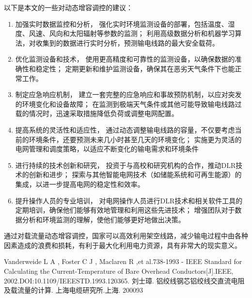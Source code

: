 \documentclass[withoutpreface,bwprint]{cumcmthesis}  %
\begin{document}
        以下是本文的一些对动态增容调控的建议：
        \begin{enumerate}
            \item  加强实时数据监控和分析，
        强化实时环境监测设备的部署，包括温度、湿度、风速、风向和太阳辐射等参数的监测；
        利用高级数据分析和机器学习算法，对收集到的数据进行实时分析，预测输电线路的最大安全载荷。
            \item  优化监测设备和技术，
        使用更高精度和可靠性的监测设备，以确保数据的准确性和稳定性；
        定期更新和维护监测设备，确保其在恶劣天气条件下也能正常工作。
            \item 制定应急响应机制，
        建立一套完整的应急响应和事故预防机制，以应对突发的环境变化和设备故障；
        在监测到极端天气条件或其他可能导致输电线路过载的情况时，迅速采取措施降低负荷或调整电网配置。
            \item 提高系统的灵活性和适应性，
        通过动态调整输电线路的容量，不仅要考虑当前的环境条件，还要预测未来几小时甚至几天的环境变化；
        实施更为灵活的电网管理和调度策略，以适应不断变化的输电需求和环境条件
            \item 进行持续的技术创新和研究，
        投资于与高校和研究机构的合作，推动DLR技术的创新和进步；
        探索与其他智能电网技术（如储能系统和可再生能源）的集成，以进一步提高电网的稳定性和效率。
            \item 提升操作人员的专业培训，
        对电网操作人员进行DLR技术和相关软件工具的定期培训，确保他们能够有效地管理和利用这些先进技术；
        增强团队对于数据分析和环境监测的理解，使他们能够更好地做出决策。
        \end{enumerate}
        通过对载流量动态增容调控，国家可以高效利用架空线路，减少输电过程中由各种因素造成的浪费和损耗，有利于最大化利用电力资源，具有非常大的现实意义。

	\begin{thebibliography}{99}  
         Vanderweide L A , Foster C J , Maclaren R ,et al.738-1993 - IEEE Standard for Calculating the Current-Temperature of Bare Overhead Conductors[J].IEEE, 2002.DOI:10.1109/IEEESTD.1993.120365.
		 刘士璋. 铝绞线钢芯铝绞线交直流电阻及载流量的计算. 上海电缆研究所.上海. 200093
	\end{thebibliography}

 
	\newpage
 
\end{document}
